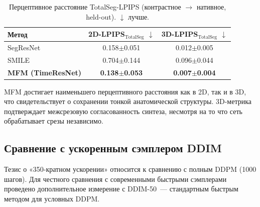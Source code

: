 \begin{table}[htbp]
\centering
\caption{Перцептивное расстояние TotalSeg-LPIPS (контрастное $\to$ нативное, held-out). $\downarrow$ лучше.}
\label{tab:lpips}
\begin{tabular}{lcc}
\toprule
\textbf{Метод} & \textbf{2D-LPIPS}$_{\text{TotalSeg}}$ $\downarrow$ & \textbf{3D-LPIPS}$_{\text{TotalSeg}}$ $\downarrow$ \\
\midrule
SegResNet & 0.158$\pm$0.051 & 0.012$\pm$0.005 \\
SMILE~\cite{liu2025see} & 0.704$\pm$0.144 & 0.096$\pm$0.044 \\
\textbf{MFM (TimeResNet)} & \textbf{0.138$\pm$0.053} & \textbf{0.007$\pm$0.004} \\
\bottomrule
\end{tabular}
\end{table}

MFM достигает наименьшего перцептивного расстояния как в 2D, так и в 3D, что свидетельствует о сохранении тонкой анатомической структуры. 3D-метрика подтверждает межсрезовую согласованность синтеза, несмотря на то что сеть обрабатывает срезы независимо.

\subsection{Сравнение с ускоренным сэмплером DDIM}
\label{sec:ddim_comparison}

Тезис о «350-кратном ускорении» относится к сравнению с полным DDPM (1000 шагов). Для честного сравнения с современными быстрыми сэмплерами проведено дополнительное измерение с DDIM-50~--- стандартным быстрым методом для условных DDPM.

\begin{table}[htbp]
\centering
\caption{MFM против DDPM и DDIM-50 (контрастное $\to$ нативное, held-out).}
\label{tab:ddim}
\end{table}

